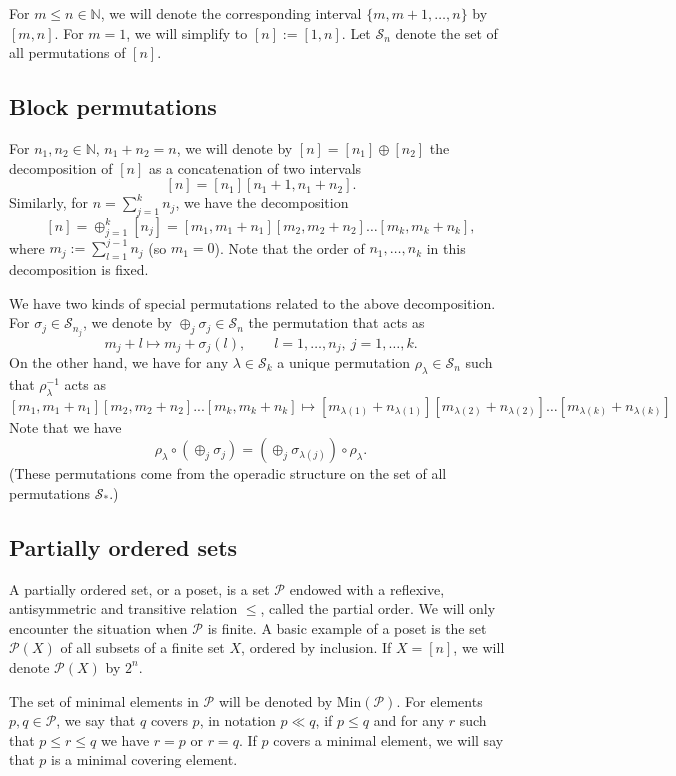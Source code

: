\documentclass[12pt]{article}
\theoremstyle{definition}
\theoremstyle{remark}
\def\cover{\ll}
\def\Pe{\mathcal P}
\def\permut{\mathscr{S}}
\begin{document}
For $m\le n\in \mathbb N$, we will denote the corresponding interval $\{m,m+1,\dots,n\}$ by
$[m,n]$. For $m=1$, we will simplify to  $[n]:=[1,n]$. Let $\permut_n$ denote the set of all permutations of $[n]$.


\subsection{Block permutations}
\label{sec:permut}


 For $n_1,n_2\in \mathbb N$, $n_1+n_2=n$, 
we will denote by $[n]=[n_1]\oplus [n_2]$ the decomposition of $[n]$ as a concatenation of two 
intervals
\[
[n]=[n_1][n_1+1,n_1+n_2].
\]
Similarly, for $n=\sum_{j=1}^kn_j$, we have the decomposition
\[
[n]=\oplus_{j=1}^k[n_j]=[m_1,m_1+n_1][m_2,m_2+n_2]\dots[m_k,m_k+n_k],
\]
where $m_j:=\sum_{l=1}^{j-1} n_j$ (so $m_1=0$). Note that the order of $n_1,\dots, n_k$ in
this decomposition is
fixed. 

We have two kinds of special permutations related to the above decomposition. For
$\sigma_j\in \permut_{n_j}$, we denote by $\oplus_j \sigma_j\in \permut_n$ the permutation that acts as
\[
m_j+l\mapsto m_j+\sigma_j(l),\qquad l=1,\dots,n_j,\ j=1,\dots, k. 
\]
On the other hand, we have for any $\lambda\in \permut_k$ a unique permutation
$\rho_\lambda\in\permut_n$  such that $\rho_\lambda^{-1}$ acts as
\[
[m_1,m_1+n_1][m_2,m_2+n_2]...[m_k,m_k+n_k]\mapsto
[m_{\lambda(1)}+n_{\lambda(1)}][m_{\lambda(2)}+n_{\lambda(2)}]\dots[m_{\lambda(k)}+n_{\lambda(k)}]
\]
Note that we have
\[
\rho_\lambda\circ(\oplus_j\sigma_j)=(\oplus_j \sigma_{\lambda(j)})\circ\rho_\lambda.
\]
(These permutations  come from the operadic structure on the set of
all permutations $\permut_*$.)


\subsection{Partially ordered sets}

A partially ordered set, or a poset, is a set $\Pe$ endowed with a reflexive, antisymmetric and
transitive relation $\le$, called the partial order. We will only encounter  the situation
when $\Pe$ is finite. A basic example of a poset is the set $\Pe(X)$ of all subsets of a
finite set $X$, ordered by inclusion. If $X=[n]$, we will denote $\Pe(X)$ by $2^n$. 


The set of minimal elements in $\Pe$ will be denoted by $\mathrm{Min}(\Pe)$. 
For elements $p,q\in \Pe$, we say that $q$ covers $p$, in notation $p\cover q$,  if $p\le q$
and for any $r$ such that $p\le r\le q$ we have $r=p$ or $r=q$. If $p$ covers a minimal
element, we will say that $p$ is a minimal covering element.
\end{document}
